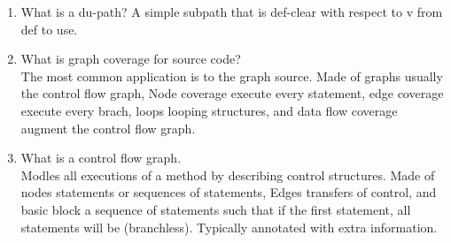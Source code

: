 \documentclass[10pt]{article}
\begin{document}
\begin{enumerate}
      \item What is a du-path?
            A simple subpath that is def-clear with respect to v from def to use.\\

      \item What is graph coverage for source code?\\
            The most common application is to the graph source. Made of graphs usually the control flow graph, Node coverage execute every statement, edge coverage execute every brach, loops looping structures, and data flow coverage
            augment the control flow graph.\\

      \item What is a control flow graph.\\
            Modles all executions of a method by describing control structures. Made of nodes statements or sequences of statements, Edges transfers of control, and basic block a sequence of statements
            such that if the first statement, all statements will be (branchless). Typically annotated with extra information.\\



\end{enumerate}
\end{document}
